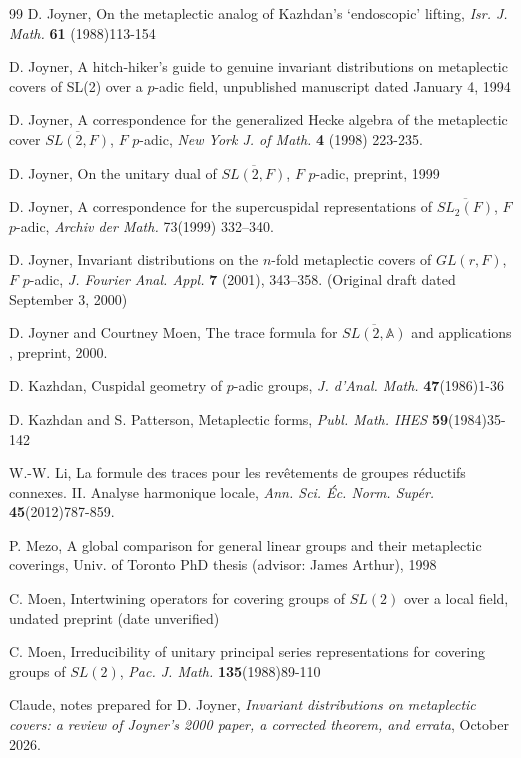 \documentclass[12pt,letterpaper]{article}
\theoremstyle{definition}
\theoremstyle{remark}
\newcommand{\aaa}{\mathbb{A}}
\begin{document}
\begin{thebibliography}{99}
  D. Joyner,  On the metaplectic
analog of Kazhdan's `endoscopic' lifting,  
{\it Isr. J. Math.} {\bf 61}
(1988)113-154

  D. Joyner,  A hitch-hiker's guide to genuine invariant 
distributions on metaplectic covers of SL(2) over a $p$-adic field, 
unpublished manuscript dated January 4, 1994 

  D. Joyner,  A correspondence for the generalized Hecke 
algebra of
the metaplectic cover $\overline{SL(2,F)}$, $F$ $p$-adic, 
{\it New York J. of Math.} {\bf 4} (1998) 223-235. 

  D. Joyner,  On the unitary dual of 
$\overline{SL(2,F)}$, $F$ $p$-adic,  
preprint, 1999 

 D. Joyner,  A correspondence for the supercuspidal
representations of $\overline{SL_2(F)}$, $F$ $p$-adic,  
{\it Archiv der Math.} 73(1999) 332--340.

  D. Joyner,  Invariant distributions on the
$n$-fold metaplectic covers of $GL(r,F)$,
$F$ $p$-adic, \emph{J. Fourier Anal. Appl.} \textbf{7} (2001), 343--358.
(Original draft dated September 3, 2000)

 D. Joyner and Courtney Moen, 
 The trace formula for $\overline{SL(2,\aaa)}$
 and applications , preprint, 2000.

 D. Kazhdan,  Cuspidal geometry of $p$-adic groups, 
{\it J. d'Anal. Math.} {\bf 47}(1986)1-36

 D. Kazhdan and  S. Patterson, 
 Metaplectic forms,  {\it Publ. Math. IHES} {\bf 59}(1984)35-142

 W.-W. Li, La formule des traces pour les rev\^etements de groupes r\'eductifs connexes.
II. Analyse harmonique locale, {\it Ann. Sci. \'Ec. Norm. Sup\'er.} {\bf 45}(2012)787-859.

 P. Mezo,  A global comparison for general linear groups
and their metaplectic coverings,  Univ. of Toronto PhD thesis
(advisor: James Arthur), 1998

 C. Moen,  Intertwining operators for covering groups 
of $SL(2)$ over a local field,  undated preprint (date unverified)

 C. Moen,  Irreducibility of unitary principal series 
representations for covering groups of $SL(2)$, 
{\it  Pac. J. Math.} {\bf 135}(1988)89-110

 Claude, notes prepared for D. Joyner, {\it Invariant distributions on metaplectic covers: a review
of Joyner's 2000 paper, a corrected theorem, and errata}, October 2026.


\end{thebibliography}
\end{document}
